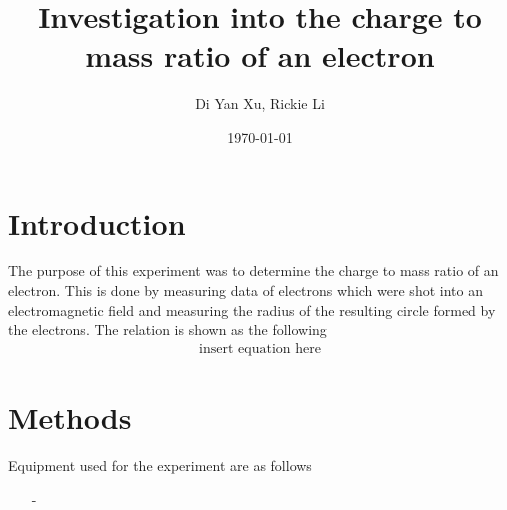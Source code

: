 \documentclass{article}
\title{Investigation into the charge to mass ratio of an electron}
\author{Di Yan Xu, Rickie Li}
\date{\today}
\begin{document}
\maketitle

\newpage

\section{Introduction}
The purpose of this experiment was to determine the charge to mass ratio of an
electron. This is done by measuring data of electrons which were shot into
an electromagnetic field and measuring the radius of the resulting circle
formed by the electrons. The relation is shown as the following
\begin{align*}
    \text{insert equation here}
\end{align*}

\section{Methods}
Equipment used for the experiment are as follows
\begin{itemize}
    \item[-] 
\end{itemize}
\end{document}
